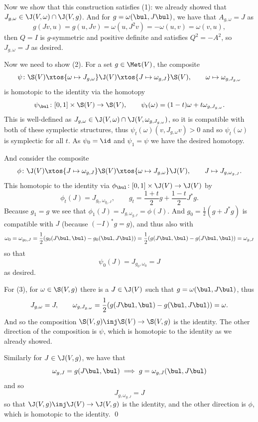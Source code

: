     Now we show that this construction satisfies (1): we already showed that $J_{g,\omega}\in\J(V,\omega)\cap\J(V,g)$.
    And for $g=\omega(\bul,J\bul)$, we have that $A_{g,\omega}=J$ as
    $$ g(Jv,u) = g(u,Jv) = \omega(u,J^2v) = -\omega(u,v) = \omega(v,u) , $$
    then $Q=I$ is $g$-symmetric and positive definite and satisfies $Q^2=-A^2$, so $J_{g,\omega}=J$ as desired.

    Now we need to show (2).
    For a set $g\in\Met(V)$, the composite
    $$ \psi\colon \S(V) \xtos{\omega\mapsto J_{g,\omega}} \J(V) \xtos{J\mapsto\omega_{g,J}} \S(V),\qquad \omega\mapsto\omega_{g,J_{g,\omega}} $$
    is homotopic to the identity via the homotopy
    $$ \psi_\bul\colon [0,1]\times\S(V) \to\S(V),\qquad \psi_t(\omega) = (1-t)\omega + t\omega_{g,J_{g,\omega}} . $$
    This is well-defined as $J_{g,\omega}\in\J(V,\omega)\cap\J(V,\omega_{g,J_{g,\omega}})$, so it is compatible with both of these symplectic structures, thus $\psi_t(\omega)(v,J_{g,\omega}v)>0$ and so
    $\psi_t(\omega)$ is symplectic for all $t$.
    As $\psi_0=\id$ and $\psi_1=\psi$ we have the desired homotopy.

    And consider the composite
    $$ \phi\colon \J(V) \xtos{J\mapsto\omega_{g,J}} \S(V) \xtos{\omega\mapsto J_{g,\omega}} \J(V),\qquad J \mapsto J_{g,\omega_{g,J}} . $$
    This homotopic to the identity via $\phi_\bul\colon[0,1]\times\J(V)\to\J(V)$ by
    $$ \phi_t(J) = J_{g_t,\omega_{g_t,J}},\qquad g_t = \frac{1+t}2g + \frac{1-t}2J^*g . $$
    Because $g_1=g$ we see that $\phi_1(J)=J_{g,\omega_{g,J}}=\phi(J)$.
    And $g_0=\frac12(g+J^*g)$ is compatible with $J$ (because $(-I)^*g=g$), and thus also with
    $$ \omega_0 = \omega_{g_0,J} = \frac12(g_0(J\bul,\bul) - g_0(\bul,J\bul)) = \frac12(g(J\bul,\bul) - g(J\bul,\bul)) = \omega_{g,J} $$
    so that
    $$ \psi_0(J) = J_{g_0,\omega_0} = J $$
    as desired.

    For (3), for $\omega\in\S(V,g)$ there is a $J\in\J(V)$ such that $g=\omega(\bul,J\bul)$, thus
    $$ J_{g,\omega} = J,\qquad \omega_{g,J_{g,\omega}} = \frac12(g(J\bul,\bul) - g(\bul,J\bul)) = \omega . $$
    And so the composition $\S(V,g)\inj\S(V)\to\S(V,g)$ is the identity.
    The other direction of the composition is $\psi$, which is homotopic to the identity as we already showed.

    Similarly for $J\in\J(V,g)$, we have that
    $$ \omega_{g,J} = g(J\bul,\bul) \implies g = \omega_{g,J}(\bul,J\bul) $$
    and so
    $$ J_{g,\omega_{g,J}} = J $$
    so that $\J(V,g)\inj\J(V)\to\J(V,g)$ is the identity, and the other direction is $\phi$, which is homotopic to the identity.
    \qed

